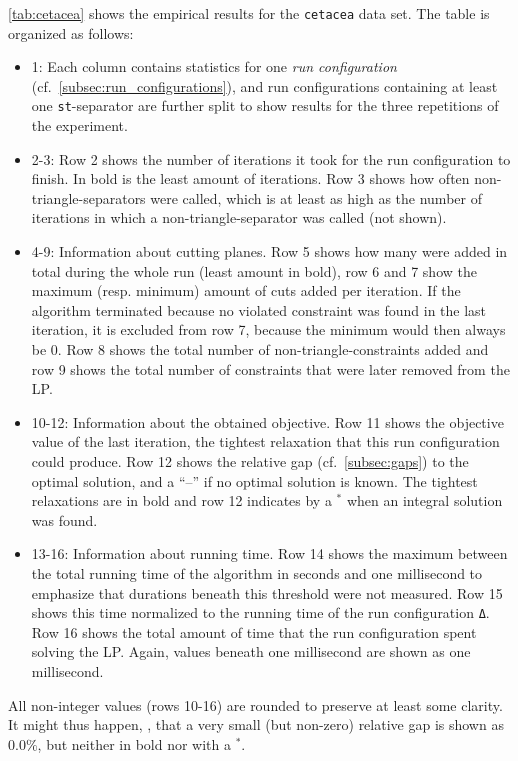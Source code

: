 \begin{landscape}
\cref{tab:cetacea} shows the empirical results for the \texttt{cetacea} data set.
The table is organized as follows:
\begin{itemize}
	\item 1: Each column contains statistics for one \textit{run configuration} (cf.\ \cref{subsec:run_configurations}),
		and run configurations containing at least one \texttt{st}-separator are further split to show results for the three repetitions of the experiment.
	\item 2-3: Row 2 shows the number of iterations it took for the run configuration to finish. 
		In bold is the least amount of iterations.
		Row 3 shows how often non-triangle-separators were called, which is at least as high as the number of iterations in which a non-triangle-separator was called (not shown).
	\item 4-9: Information about cutting planes. 
		Row 5 shows how many were added in total during the whole run (least amount in bold),
		row 6 and 7 show the maximum (resp. minimum) amount of cuts added per iteration.
		If the algorithm terminated because no violated constraint was found in the last iteration, it is excluded from row 7, because the minimum would then always be 0.
		Row 8 shows the total number of non-triangle-constraints added
		and row 9 shows the total number of constraints that were later removed from the LP.
	\item 10-12: Information about the obtained objective.
		Row 11 shows the objective value of the last iteration, \ie the tightest relaxation that this run configuration could produce.
		Row 12 shows the relative gap (cf.\ \cref{subsec:gaps}) to the optimal solution, and a “–” if no optimal solution is known.
		The tightest relaxations are in bold and row 12 indicates by a $^{*}$ when an integral solution was found.
	\item 13-16: Information about running time.
		Row 14 shows the maximum between the total running time of the algorithm in seconds and one millisecond to emphasize that durations beneath this threshold were not measured.
		Row 15 shows this time normalized to the running time of the run configuration \texttt{Δ}.
		Row 16 shows the total amount of time that the run configuration spent solving the LP. Again, values beneath one millisecond are shown as one millisecond.
\end{itemize}
All non-integer values (rows 10-16) are rounded to preserve at least some clarity.
It might thus happen, \eg, that a very small (but non-zero) relative gap is shown as $0.0\%$, but neither in bold nor with a $^{*}$.


\end{landscape}
